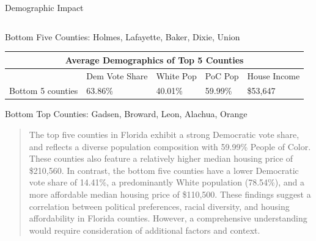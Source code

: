 \documentclass[xcolor=dvipsnames]{beamer}
\newlength{\onecolwid}
\newlength{\twocolwid}
\begin{document}
\begin{frame}[t]
\begin{columns}[t]
\begin{column}{\twocolwid}
\begin{columns}[t,totalwidth=\twocolwid]
\begin{column}{\onecolwid}
\begin{block}{Demographic Impact}
\begin{tabular}{ |p{5.2cm}|p{5.9cm}|p{5cm}|p{4.2cm}|p{5cm}|}
\end{tabular}
\newline
\newline
Bottom Five Counties: Holmes, Lafayette, Baker, Dixie, Union

\newline
\begin{tabular}{ |p{5.2cm}|p{5.9cm}|p{5cm}|p{4.2cm}|p{5cm}|}

 \hline
 \multicolumn{5}{|c|}{Average Demographics of Top 5 Counties} \\
 \hline
 & Dem Vote Share &White Pop &PoC Pop & House Income\\
 \hline
 Bottom 5 counties   & 63.86\%    &40.01\% &  59.99\%  & \$53,647\\
 \hline

\end{tabular}
\newline
\newline
Bottom Top Counties: Gadsen, Broward, Leon, Alachua, Orange

\begin{quote}
The top five counties in Florida exhibit a strong Democratic vote share, and reflects a diverse population composition with 59.99\% People of Color. These counties also feature a relatively higher median housing price of \$210,560. In contrast, the bottom five counties have a lower Democratic vote share of 14.41\%, a predominantly White population (78.54\%), and a more affordable median housing price of \$110,500. These findings suggest a correlation between political preferences, racial diversity, and housing affordability in Florida counties. However, a comprehensive understanding would require consideration of additional factors and context.
\end{quote}
\end{block}



\end{column} %

\end{columns} %

\begin{columns}[t,totalwidth=\twocolwid] %

\end{columns} %


\end{column}
\end{columns}
\end{frame}
\end{document}
